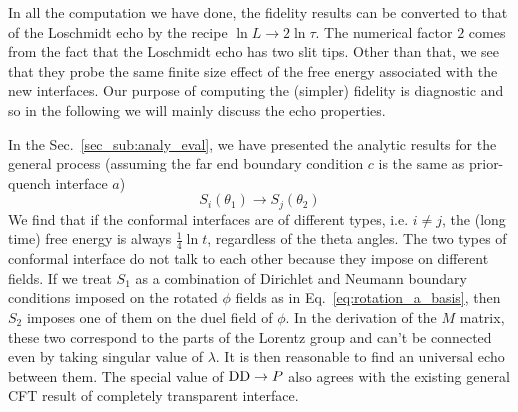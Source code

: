 

In all the computation we have done, the fidelity results can be converted to that of the Loschmidt echo by the recipe $ \ln L \rightarrow 2 \ln \tau$. The numerical factor $2$ comes from the fact that the Loschmidt echo has two slit tips. Other than that, we see that they probe the same finite size effect of the free energy associated with the new interfaces. Our purpose of computing the (simpler) fidelity is diagnostic and so in the following we will mainly discuss the echo properties. 

In the Sec.~\ref{sec_sub:analy_eval}, we have presented the analytic results for the general process (assuming the far end boundary condition $c$ is the same as prior-quench interface $a$) 
\begin{equation}
 S_i( \theta_1 ) \rightarrow S_j( \theta_2 )
\end{equation}
We find that if the conformal interfaces are of different types, i.e. $i \ne j$, the (long time) free energy is always $\frac{1}{4} \ln t$, regardless of the theta angles. The two types of conformal interface do not talk to each other because they impose on different fields. If we treat $S_1$ as a combination of Dirichlet and Neumann boundary conditions imposed on the rotated $\phi$ fields as in Eq.~\eqref{eq:rotation_a_basis}, then $S_2$ imposes one of them on the duel field of $\phi$. In the derivation of the $M$ matrix, these two correspond to the parts of the Lorentz group and can't be connected even by taking singular value of $\lambda$. It is then reasonable to find an universal echo between them. The special value of ${\rm DD} \rightarrow P$ also agrees with the existing general CFT result of completely transparent interface\cite{stephan_logarithmic_2013,stephan_local_2011,vasseur_universal_2014,vasseur_crossover_2013,kennes_universal_2014}. 


